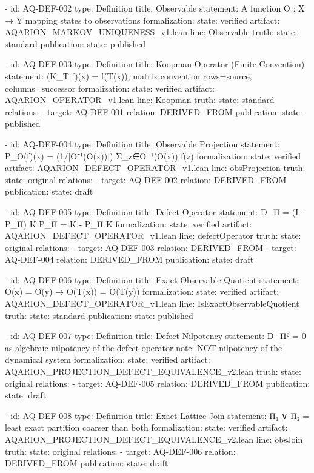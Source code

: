   - id: AQ-DEF-002
    type: Definition
    title: Observable
    statement: A function O : X → Y mapping states to observations
    formalization:
      state: verified
      artifact: AQARION_MARKOV_UNIQUENESS_v1.lean
      line: Observable
    truth:
      state: standard
    publication:
      state: published

  - id: AQ-DEF-003
    type: Definition
    title: Koopman Operator (Finite Convention)
    statement: (K_T f)(x) = f(T(x)); matrix convention rows=source, columns=successor
    formalization:
      state: verified
      artifact: AQARION_OPERATOR_v1.lean
      line: Koopman
    truth:
      state: standard
    relations:
      - target: AQ-DEF-001
        relation: DERIVED_FROM
    publication:
      state: published

  - id: AQ-DEF-004
    type: Definition
    title: Observable Projection
    statement: P_O(f)(x) = (1/|O⁻¹(O(x))|) Σ_{z∈O⁻¹(O(x))} f(z)
    formalization:
      state: verified
      artifact: AQARION_DEFECT_OPERATOR_v1.lean
      line: obsProjection
    truth:
      state: original
    relations:
      - target: AQ-DEF-002
        relation: DERIVED_FROM
    publication:
      state: draft

  - id: AQ-DEF-005
    type: Definition
    title: Defect Operator
    statement: D_Π = (I - P_Π) K P_Π = K - P_Π K
    formalization:
      state: verified
      artifact: AQARION_DEFECT_OPERATOR_v1.lean
      line: defectOperator
    truth:
      state: original
    relations:
      - target: AQ-DEF-003
        relation: DERIVED_FROM
      - target: AQ-DEF-004
        relation: DERIVED_FROM
    publication:
      state: draft

  - id: AQ-DEF-006
    type: Definition
    title: Exact Observable Quotient
    statement: O(x) = O(y) → O(T(x)) = O(T(y))
    formalization:
      state: verified
      artifact: AQARION_DEFECT_OPERATOR_v1.lean
      line: IsExactObservableQuotient
    truth:
      state: standard
    publication:
      state: published

  - id: AQ-DEF-007
    type: Definition
    title: Defect Nilpotency
    statement: D_Π² = 0 as algebraic nilpotency of the defect operator
    note: NOT nilpotency of the dynamical system
    formalization:
      state: verified
      artifact: AQARION_PROJECTION_DEFECT_EQUIVALENCE_v2.lean
    truth:
      state: original
    relations:
      - target: AQ-DEF-005
        relation: DERIVED_FROM
    publication:
      state: draft

  - id: AQ-DEF-008
    type: Definition
    title: Exact Lattice Join
    statement: Π₁ ∨ Π₂ = least exact partition coarser than both
    formalization:
      state: verified
      artifact: AQARION_PROJECTION_DEFECT_EQUIVALENCE_v2.lean
      line: obsJoin
    truth:
      state: original
    relations:
      - target: AQ-DEF-006
        relation: DERIVED_FROM
    publication:
      state: draft

